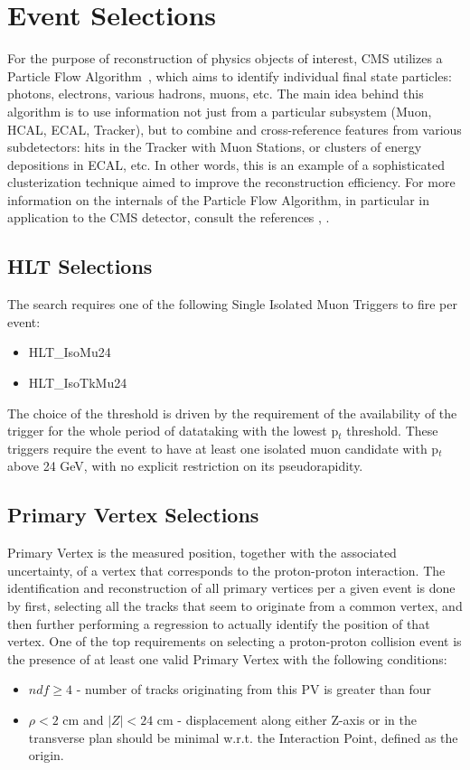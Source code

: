 \section{Event Selections} \label{section:higgs_selections}
For the purpose of reconstruction of physics objects of interest, CMS utilizes a Particle Flow Algorithm~\cite{CMS-PAS-PFT-10-002}, which aims to identify individual final state particles: photons, electrons, various hadrons, muons, etc. The main idea behind this algorithm is to use information not just from a particular subsystem (Muon, HCAL, ECAL, Tracker), but to combine and cross-reference features from various subdetectors: hits in the Tracker with Muon Stations, or clusters of energy depositions in ECAL, etc. In other words, this is an example of a sophisticated clusterization technique aimed to improve the reconstruction efficiency. For more information on the internals of the Particle Flow Algorithm, in particular in application to the CMS detector, consult the references \cite{Beaudette:2014cea}, \cite{Sirunyan:2017ulk}.

\subsection{HLT Selections}
The search requires one of the following Single Isolated Muon Triggers to fire per event:
\begin{itemize}
  \item HLT\_IsoMu24
  \item HLT\_IsoTkMu24
\end{itemize}
The choice of the threshold is driven by the requirement of the availability of the trigger for the whole period of datataking with the lowest p$_t$ threshold. These triggers require the event to have at least one isolated muon candidate with p$_t$ above 24 GeV, with no explicit restriction on its pseudorapidity.

\subsection{Primary Vertex Selections}
Primary Vertex is the measured position, together with the associated uncertainty, of a vertex that corresponds to the proton-proton interaction. The identification and reconstruction of all primary vertices per a given event is done by first, selecting all the tracks that seem to originate from a common vertex, and then further performing a regression to actually identify the position of that vertex. One of the top requirements on selecting a proton-proton collision event is the presence of at least one valid Primary Vertex with the following conditions:
\begin{itemize}
  \item $ndf \ge 4$ - number of tracks originating from this PV is greater than four
  \item $\rho < 2$ cm and $|Z| < 24$ cm - displacement along either Z-axis or in the transverse plan should be minimal w.r.t. the Interaction Point, defined as the origin.
\end{itemize}

